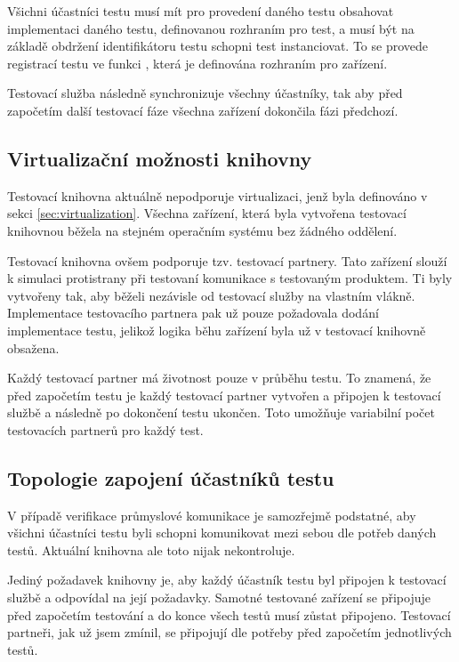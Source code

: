 Všichni účastníci testu musí mít pro provedení daného testu obsahovat implementaci daného testu, definovanou rozhraním pro test, a musí být na základě obdržení identifikátoru testu schopni test instanciovat. To se provede registrací testu ve funkci , která je definována rozhraním pro zařízení.

Testovací služba následně synchronizuje všechny účastníky, tak aby před započetím další testovací fáze všechna zařízení dokončila fázi předchozí. 

\subsection{Virtualizační možnosti knihovny}

Testovací knihovna aktuálně nepodporuje virtualizaci, jenž byla definováno v sekci \ref{sec:virtualization}. Všechna zařízení, která byla vytvořena testovací knihovnou běžela na stejném operačním systému bez žádného oddělení.

Testovací knihovna ovšem podporuje tzv. testovací partnery. Tato zařízení slouží k simulaci protistrany při testovaní komunikace s testovaným produktem. Ti byly vytvořeny tak, aby běželi nezávisle od testovací služby na vlastním vlákně. Implementace testovacího partnera pak už pouze požadovala dodání implementace testu, jelikož logika běhu zařízení byla už v testovací knihovně obsažena.

Každý testovací partner má životnost pouze v průběhu testu. To znamená, že před započetím testu je každý testovací partner vytvořen a připojen k testovací službě a následně po dokončení testu ukončen. Toto umožňuje variabilní počet testovacích partnerů pro každý test.

\subsection{Topologie zapojení účastníků testu}

V případě verifikace průmyslové komunikace je samozřejmě podstatné, aby všichni účastníci testu byli schopni komunikovat mezi sebou dle potřeb daných testů. Aktuální knihovna ale toto nijak nekontroluje. 

Jediný požadavek knihovny je, aby každý účastník testu byl připojen k testovací službě a odpovídal na její požadavky. Samotné testované zařízení se připojuje před započetím testování a do konce všech testů musí zůstat připojeno. Testovací partneři, jak už jsem zmínil, se připojují dle potřeby před započetím jednotlivých testů.

